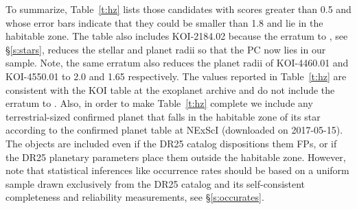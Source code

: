 To summarize, Table~\ref{t:hz} lists those candidates with scores greater than 0.5 and whose error bars indicate that they could be smaller than 1.8 \re{} and lie in the habitable zone. The table also includes KOI-2184.02 because the erratum to \citet{Mathur2017ApJS}, see \S\ref{s:stars}, reduces the stellar and planet radii so that the PC now lies in our sample. Note, the same erratum also reduces the planet radii of KOI-4460.01 and KOI-4550.01 to 2.0\re{} and 1.65\re{} respectively. The values reported in Table~\ref{t:hz} are consistent with the KOI table at the exoplanet archive and do not include the erratum to \citet{Mathur2017ApJS}. Also, in order to make Table~\ref{t:hz} complete we include any terrestrial-sized confirmed planet that falls in the habitable zone of its star according to the confirmed planet table at NExScI (downloaded on 2017-05-15). The objects are included even if the DR25 catalog dispositions them FPs, or if the DR25 planetary parameters place them outside the habitable zone. However, note that statistical inferences like occurrence rates should be based on a uniform sample drawn exclusively from the DR25 catalog and its self-consistent completeness and reliability measurements, see \S\ref{s:occurates}.  



